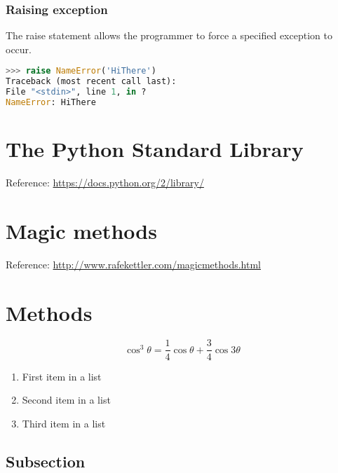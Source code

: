 \documentclass[fleqn,10pt]{SelfArx} %
\begin{document}
	\subsubsection{Raising exception}
	The raise statement allows the programmer to force a specified exception to occur. 
	\begin{lstlisting}[language=Python, basicstyle=\scriptsize]
>>> raise NameError('HiThere')
Traceback (most recent call last):
File "<stdin>", line 1, in ?
NameError: HiThere
	\end{lstlisting}
	
	
	\section{The Python Standard Library} 
	
	Reference: \url{https://docs.python.org/2/library/}
	
	
	\section{Magic methods}

	Reference: \url{http://www.rafekettler.com/magicmethods.html}
	
	\section{Methods}

	\begin{equation}
	\cos^3 \theta =\frac{1}{4}\cos\theta+\frac{3}{4}\cos 3\theta
	\label{eq:refname2}
	\end{equation}
	
	\lipsum[5] %
	
	\begin{enumerate}[noitemsep] %
		\item First item in a list
		\item Second item in a list
		\item Third item in a list
	\end{enumerate}
	
	\subsection{Subsection}
	
\end{document}
